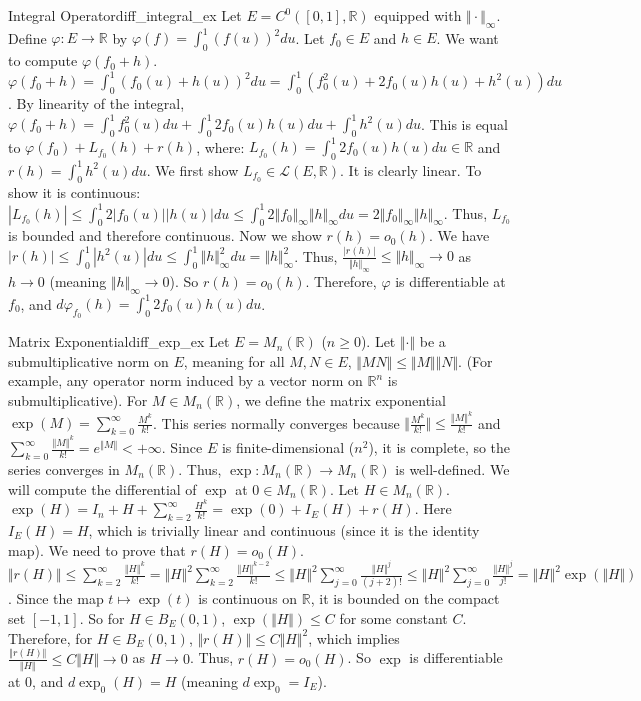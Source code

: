 \documentclass[11pt, a4paper]{article}
\newcommand{\R}{\mathbb{R}}
\begin{document}
\begin{example}{Integral Operator}{diff_integral_ex}
Let $E = C^0([0,1], \R)$ equipped with $\Vert \cdot \Vert_\infty$.
Define $\varphi: E \to \R$ by $\varphi(f) = \int_0^1 (f(u))^2 du$.
Let $f_0 \in E$ and $h \in E$. We want to compute $\varphi(f_0 + h)$.
$\varphi(f_0 + h) = \int_0^1 (f_0(u) + h(u))^2 du = \int_0^1 (f_0^2(u) + 2f_0(u)h(u) + h^2(u)) du$.
By linearity of the integral, $\varphi(f_0 + h) = \int_0^1 f_0^2(u)du + \int_0^1 2f_0(u)h(u)du + \int_0^1 h^2(u)du$.
This is equal to $\varphi(f_0) + L_{f_0}(h) + r(h)$, where:
$L_{f_0}(h) = \int_0^1 2f_0(u)h(u)du \in \R$ and $r(h) = \int_0^1 h^2(u)du$.
We first show $L_{f_0} \in \mathcal{L}(E, \R)$. It is clearly linear. To show it is continuous:
$|L_{f_0}(h)| \le \int_0^1 2|f_0(u)||h(u)|du \le \int_0^1 2\Vert f_0 \Vert_\infty \Vert h \Vert_\infty du = 2\Vert f_0 \Vert_\infty \Vert h \Vert_\infty$.
Thus, $L_{f_0}$ is bounded and therefore continuous.
Now we show $r(h) = o_0(h)$. We have $|r(h)| \le \int_0^1 |h^2(u)|du \le \int_0^1 \Vert h \Vert_\infty^2 du = \Vert h \Vert_\infty^2$.
Thus, $\frac{|r(h)|}{\Vert h \Vert_\infty} \le \Vert h \Vert_\infty \to 0$ as $h \to 0$ (meaning $\Vert h \Vert_\infty \to 0$). So $r(h) = o_0(h)$.
Therefore, $\varphi$ is differentiable at $f_0$, and $d\varphi_{f_0}(h) = \int_0^1 2f_0(u)h(u)du$.
\end{example}

\begin{example}{Matrix Exponential}{diff_exp_ex}
Let $E = M_n(\R)$ ($n \ge 0$). Let $\Vert \cdot \Vert$ be a submultiplicative norm on $E$, meaning for all $M, N \in E$, $\Vert MN \Vert \le \Vert M \Vert \Vert N \Vert$. (For example, any operator norm induced by a vector norm on $\R^n$ is submultiplicative).
For $M \in M_n(\R)$, we define the matrix exponential $\exp(M) = \sum_{k=0}^\infty \frac{M^k}{k!}$.
This series normally converges because $\Vert \frac{M^k}{k!} \Vert \le \frac{\Vert M \Vert^k}{k!}$ and $\sum_{k=0}^\infty \frac{\Vert M \Vert^k}{k!} = e^{\Vert M \Vert} < +\infty$.
Since $E$ is finite-dimensional ($n^2$), it is complete, so the series converges in $M_n(\R)$. Thus, $\exp: M_n(\R) \to M_n(\R)$ is well-defined.
We will compute the differential of $\exp$ at $0 \in M_n(\R)$. Let $H \in M_n(\R)$.
$\exp(H) = I_n + H + \sum_{k=2}^\infty \frac{H^k}{k!} = \exp(0) + I_E(H) + r(H)$.
Here $I_E(H) = H$, which is trivially linear and continuous (since it is the identity map).
We need to prove that $r(H) = o_0(H)$.
$\Vert r(H) \Vert \le \sum_{k=2}^\infty \frac{\Vert H \Vert^k}{k!} = \Vert H \Vert^2 \sum_{k=2}^\infty \frac{\Vert H \Vert^{k-2}}{k!} \le \Vert H \Vert^2 \sum_{j=0}^\infty \frac{\Vert H \Vert^j}{(j+2)!} \le \Vert H \Vert^2 \sum_{j=0}^\infty \frac{\Vert H \Vert^j}{j!} = \Vert H \Vert^2 \exp(\Vert H \Vert)$.
Since the map $t \mapsto \exp(t)$ is continuous on $\R$, it is bounded on the compact set $[-1, 1]$. So for $H \in B_E(0, 1)$, $\exp(\Vert H \Vert) \le C$ for some constant $C$.
Therefore, for $H \in B_E(0, 1)$, $\Vert r(H) \Vert \le C \Vert H \Vert^2$, which implies $\frac{\Vert r(H) \Vert}{\Vert H \Vert} \le C \Vert H \Vert \to 0$ as $H \to 0$.
Thus, $r(H) = o_0(H)$.
So $\exp$ is differentiable at $0$, and $d\exp_0(H) = H$ (meaning $d\exp_0 = I_E$).
\end{example}
\end{document}
